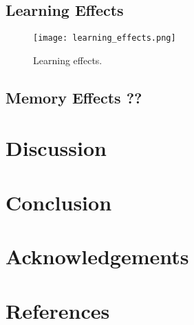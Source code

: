 \documentclass[a4paper, 12pt,oneside]{article}
\begin{document}
		\subsection{Learning Effects}
		\lipsum[1]
		\begin{figure}[htb]
			\centering
			\texttt{[image: learning\_effects.png]}
			\caption{Learning effects.}
			\label{fig:learning-effects}
		\end{figure}
		\subsection{Memory Effects ??}

	\section{Discussion}
	\section{Conclusion}
	\section*{Acknowledgements}
	\section*{References}
\end{document}
